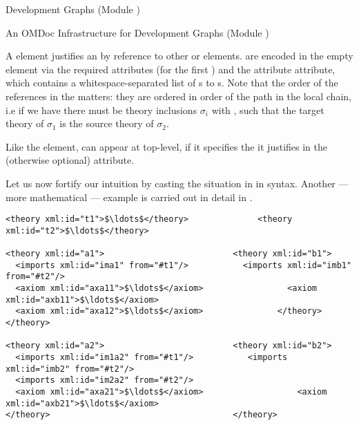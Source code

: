 \begin{omgroup}[id=complex-theories,short=Complex Theories,
                            creators=miko,contributors=frabe]
\begin{omgroup}[id=development-graphs,short=Development Graphs]{Development Graphs (Module
  {})}
\begin{module}[id=dgraph]
\begin{omgroup}[id=dg-omdoc,short=OMDoc Development Graphs]{An OMDoc Infrastructure for
  Development Graphs (Module {})}
\begin{definition}[id=path-just.def]
  A {} element justifies an  by reference to
  other  or 
  elements.  are encoded in the empty
   element via the required attributes 
  (for the first ) and the attribute
   attribute, which contains a whitespace-separated list
  of {s} to {s}. Note that the order of
  the references in the  matters: they are ordered
  in order of the path in the local chain, i.e if we have {} there must be theory inclusions $\sigma_i$ with
  {}, such that the target theory of $\sigma_1$ is the source
  theory of $\sigma_2$.
\end{definition}

Like the  element,  can appear at top-level,
if it specifies the  it justifies in the (otherwise optional)
 attribute.

Let us now fortify our intuition by casting the situation in {}
in \omdoc syntax. Another --- more mathematical --- example is carried out in detail in
{}.

\begin{lstlisting}[label=lst:thi,mathescape,
                   index={theory,imports,axiom},
                   caption={The \omdoc representation of the theories
                   in {\myfigref{thi-proof}}.}]
<theory xml:id="t1">$\ldots$</theory>              <theory xml:id="t2">$\ldots$</theory> 

<theory xml:id="a1">                          <theory xml:id="b1">
  <imports xml:id="ima1" from="#t1"/>           <imports xml:id="imb1" from="#t2"/>
  <axiom xml:id="axa11">$\ldots$</axiom>                 <axiom xml:id="axb11">$\ldots$</axiom>
  <axiom xml:id="axa12">$\ldots$</axiom>               </theory>
</theory>

<theory xml:id="a2">                          <theory xml:id="b2">
  <imports xml:id="im1a2" from="#t1"/>           <imports xml:id="imb2" from="#t2"/>
  <imports xml:id="im2a2" from="#t2"/> 
  <axiom xml:id="axa21">$\ldots$</axiom>                   <axiom xml:id="axb21">$\ldots$</axiom>
</theory>                                     </theory>


\end{lstlisting}
\end{omgroup}
\end{module}
\end{omgroup}
\end{omgroup}
